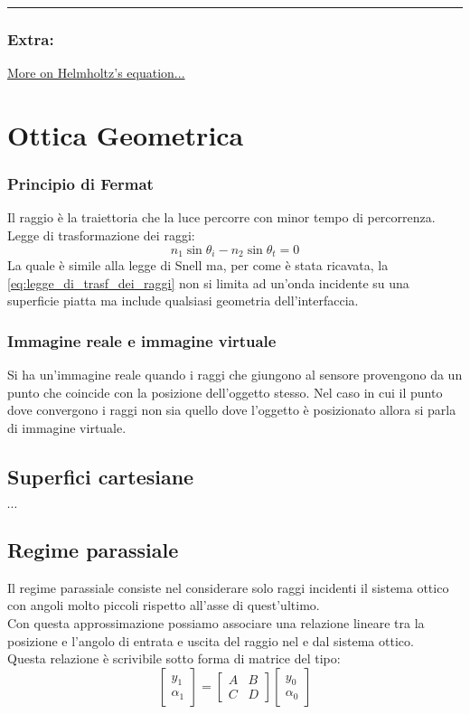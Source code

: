 \documentclass{article}
\begin{document}
\vfill
\hrule
\subsubsection*{Extra:}
\href{https://physics.stackexchange.com/questions/334084/wave-vs-helmholtz-equation}{More on Helmholtz's equation...}\\

\newpage

\section*{Ottica Geometrica}
\subsubsection*{Principio di Fermat}
Il raggio è la traiettoria che la luce percorre con minor tempo di percorrenza.\\
Legge di trasformazione dei raggi:
\begin{equation}	\label{eq:legge_di_trasf_dei_raggi}
n_1 \sin\theta_i - n_2 \sin\theta_t = 0
\end{equation}
La quale è simile alla legge di Snell ma, per come è stata ricavata, la \eqref{eq:legge_di_trasf_dei_raggi} non si limita ad un'onda incidente su una superficie piatta ma include qualsiasi geometria dell'interfaccia.

\subsubsection*{Immagine reale e immagine virtuale}
Si ha un'immagine reale quando i raggi che giungono al sensore provengono da un punto che coincide con la posizione dell'oggetto stesso. Nel caso in cui il punto dove convergono i raggi non sia quello dove l'oggetto è posizionato allora si parla di immagine virtuale.

\subsection*{Superfici cartesiane}
$\cdots$

\subsection*{Regime parassiale}
Il regime parassiale consiste nel considerare solo raggi incidenti il sistema ottico con angoli molto piccoli rispetto all'asse di quest'ultimo.\\
Con questa approssimazione possiamo associare una relazione lineare tra la posizione e l'angolo di entrata e uscita del raggio nel e dal sistema ottico.\\
Questa relazione è scrivibile sotto forma di matrice del tipo:
\[
\begin{bmatrix}
y_1\\
\alpha_1
\end{bmatrix}
=
\begin{bmatrix}
A	&	B\\
C	&	D
\end{bmatrix}
\begin{bmatrix}
y_0\\
\alpha_0
\end{bmatrix}
\]
\end{document}
